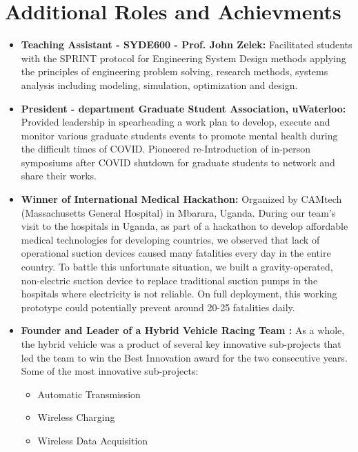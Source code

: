 \documentclass{ExpressiveResume}
\begin{document}

\section{Additional Roles and Achievments}
\begin{itemize}
\item {\textbf{Teaching Assistant - SYDE600 - Prof. John Zelek:} Facilitated students with the SPRINT protocol for Engineering System Design methods applying the principles of engineering problem solving, research methods, systems analysis including modeling, simulation, optimization and design.}
\item {\textbf{President - department Graduate Student Association, uWaterloo:} Provided leadership in spearheading a work plan to develop, execute and monitor various graduate students events to promote mental health during the difficult times of COVID. Pioneered re-Introduction of in-person symposiums after COVID shutdown for graduate students to network and share their works.}
\item {\textbf{Winner of International Medical Hackathon:} Organized by CAMtech (Massachusetts General Hospital) in Mbarara, Uganda. During our team’s visit to the hospitals in Uganda, as part of a hackathon to develop affordable medical technologies for developing countries, we observed that lack of operational suction devices caused many fatalities every day in the entire country. To battle this unfortunate situation, we built a gravity-operated, non-electric suction device to replace traditional suction pumps in the hospitals where electricity is not reliable. On full deployment, this working prototype could potentially prevent around 20-25 fatalities daily.}
\item {\textbf{Founder and Leader of a Hybrid Vehicle Racing Team :} As a whole, the hybrid vehicle was a product of several key innovative sub-projects that led the team to win the Best Innovation award for the two consecutive years. Some of the most innovative sub-projects:
\begin{itemize}
\item{Automatic Transmission}
\item{Wireless Charging}
\item{Wireless Data Acquisition}
\newline
\end{itemize}
}

\end{itemize}
\end{document}
